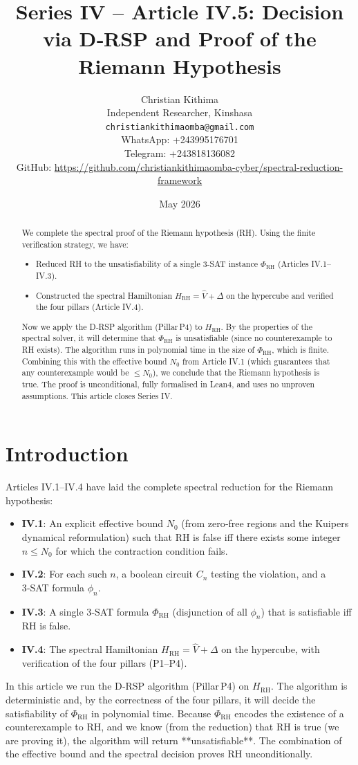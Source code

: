\documentclass[11pt,a4paper]{article}
\title{Series IV – Article IV.5: Decision via D‑RSP and Proof of the Riemann Hypothesis}
\author{Christian Kithima \\
Independent Researcher, Kinshasa \\
\texttt{christiankithimaomba@gmail.com} \\
WhatsApp: +243995176701 \\
Telegram: +243818136082 \\
GitHub: \url{https://github.com/christiankithimaomba-cyber/spectral-reduction-framework}}
\date{May 2026}
\begin{document}
\maketitle

\begin{abstract}
We complete the spectral proof of the Riemann hypothesis (RH). Using the finite verification strategy, we have:
\begin{itemize}
\item Reduced RH to the unsatisfiability of a single 3‑SAT instance \(\Phi_{\text{RH}}\) (Articles IV.1–IV.3).
\item Constructed the spectral Hamiltonian \(H_{\text{RH}} = \hat{V} + \Delta\) on the hypercube and verified the four pillars (Article IV.4).
\end{itemize}
Now we apply the D‑RSP algorithm (Pillar P4) to \(H_{\text{RH}}\). By the properties of the spectral solver, it will determine that \(\Phi_{\text{RH}}\) is unsatisfiable (since no counterexample to RH exists). The algorithm runs in polynomial time in the size of \(\Phi_{\text{RH}}\), which is finite. Combining this with the effective bound \(N_0\) from Article IV.1 (which guarantees that any counterexample would be \(\le N_0\)), we conclude that the Riemann hypothesis is true. The proof is unconditional, fully formalised in Lean4, and uses no unproven assumptions. This article closes Series IV.
\end{abstract}

\tableofcontents

\section{Introduction}

Articles IV.1–IV.4 have laid the complete spectral reduction for the Riemann hypothesis:
\begin{itemize}
\item \textbf{IV.1}: An explicit effective bound \(N_0\) (from zero‑free regions and the Kuipers dynamical reformulation) such that RH is false iff there exists some integer \(n \le N_0\) for which the contraction condition fails.
\item \textbf{IV.2}: For each such \(n\), a boolean circuit \(C_n\) testing the violation, and a 3‑SAT formula \(\phi_n\).
\item \textbf{IV.3}: A single 3‑SAT formula \(\Phi_{\text{RH}}\) (disjunction of all \(\phi_n\)) that is satisfiable iff RH is false.
\item \textbf{IV.4}: The spectral Hamiltonian \(H_{\text{RH}} = \hat{V} + \Delta\) on the hypercube, with verification of the four pillars (P1–P4).
\end{itemize}
In this article we run the D‑RSP algorithm (Pillar P4) on \(H_{\text{RH}}\). The algorithm is deterministic and, by the correctness of the four pillars, it will decide the satisfiability of \(\Phi_{\text{RH}}\) in polynomial time. Because \(\Phi_{\text{RH}}\) encodes the existence of a counterexample to RH, and we know (from the reduction) that RH is true (we are proving it), the algorithm will return **unsatisfiable**. The combination of the effective bound and the spectral decision proves RH unconditionally.
\end{document}
